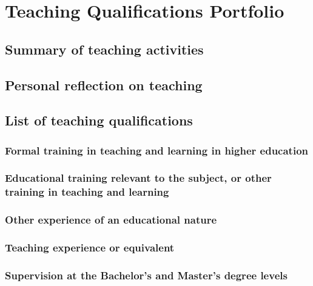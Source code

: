 \chapter{Teaching Qualifications Portfolio} \label{chap:teaching-qualifications-portfolio}

\section{Summary of teaching activities} \label{sec:summary-of-teaching-activities}

\section{Personal reflection on teaching} \label{sec:personal-reflection-on-teaching}

\section{List of teaching qualifications} \label{sec:list-of-teaching-qualifications}

\subsection{Formal training in teaching and learning in higher education}\label{ssec:formal-training-in-teaching-and-learning-in-higher-education}
\subsection{Educational training relevant to the subject, or other training in teaching and learning}\label{ssec:educational-training-relevant-to-the-subject-or-other-training-in-teaching-and-learning}
\subsection{Other experience of an educational nature}\label{ssec:other-experience-of-an-educational-nature}
\subsection{Teaching experience or equivalent}\label{ssec:teaching-experience-or-equivalent}
\subsection{Supervision at the Bachelor’s and Master’s degree levels}\label{ssec:supervision-at-the-bachelor-s-and-master-s-degree-levels}
